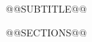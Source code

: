 \documentclass[a4paper,10pt]{article}
\begin{document}
\begin{center}@@SUBTITLE@@\end{center}
@@SECTIONS@@
\end{document}
